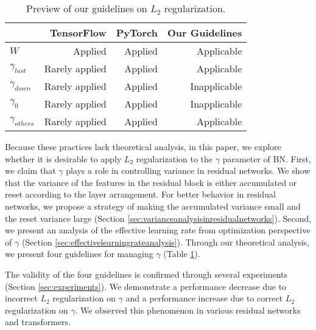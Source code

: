 \documentclass{article}
\newcommand{\cmark}{\ding{51}}\newcommand{\xmark}{\ding{55}}
\begin{document}
\begin{table}[h]
	\caption{Preview of our guidelines on $L_2$ regularization.}
	\label{tab:guideline}
	\centering
	\begin{tabular}{l|r|r|r}
		\toprule
		                  & \textbf{TensorFlow}                  & \textbf{PyTorch}                 & \textbf{Our Guidelines}               \\
		\midrule
		$W$               & Applied        \textcolor{blue}{\cmark} & Applied \textcolor{blue}{\cmark} & Applicable \textcolor{blue}{\cmark}  \\
		$\gamma_{last}$   & Rarely applied \textcolor{red}{\xmark}  & Applied \textcolor{blue}{\cmark} & Applicable \textcolor{blue}{\cmark}  \\
		$\gamma_{down}$   & Rarely applied \textcolor{red}{\xmark}  & Applied \textcolor{blue}{\cmark} & Inapplicable \textcolor{red}{\xmark} \\
		$\gamma_{0}$      & Rarely applied \textcolor{red}{\xmark}  & Applied \textcolor{blue}{\cmark} & Inapplicable \textcolor{red}{\xmark} \\
		$\gamma_{others}$ & Rarely applied \textcolor{red}{\xmark}  & Applied \textcolor{blue}{\cmark} & Applicable \textcolor{blue}{\cmark}  \\
		\bottomrule
	\end{tabular}
\end{table}

Because these practices lack theoretical analysis, in this paper, we explore whether it is desirable to apply $L_2$ regularization to the $\gamma$ parameter of BN. First, we claim that $\gamma$ plays a role in controlling variance in residual networks. We show that the variance of the features in the residual block is either accumulated or reset according to the layer arrangement. For better behavior in residual networks, we propose a strategy of making the accumulated variance small and the reset variance large (Section \ref{sec:varianceanalysisinresidualnetworks}). Second, we present an analysis of the effective learning rate from optimization perspective of $\gamma$ (Section \ref{sec:effectivelearningrateanalysis}). Through our theoretical analysis, we present four guidelines for managing $\gamma$ (Table \ref{tab:guideline}).

The validity of the four guidelines is confirmed through several experiments (Section \ref{sec:experiments}). We demonstrate a performance decrease due to incorrect $L_2$ regularization on $\gamma$ and a performance increase due to correct $L_2$ regularization on $\gamma$. We observed this phenomenon in various residual networks and transformers.
\end{document}
